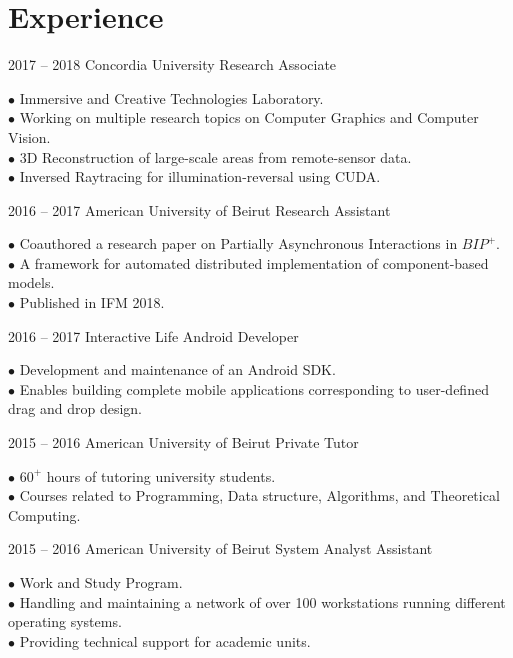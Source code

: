 \documentclass{tccv}
\begin{document}
\section{Experience}
\begin{eventlist}

\item{2017 -- 2018}
     {Concordia University}
     {Research Associate}

$\bullet$ Immersive and Creative Technologies Laboratory.\\
$\bullet$ Working on multiple research topics on Computer Graphics and Computer Vision.\\
$\bullet$ 3D Reconstruction of large-scale areas from remote-sensor data.\\
$\bullet$ Inversed Raytracing for illumination-reversal using CUDA.



\item{2016 -- 2017}
     {American University of Beirut}
     {Research Assistant}

$\bullet$ Coauthored a research paper on Partially Asynchronous Interactions in $BIP^+$.\\
$\bullet$ A framework for automated distributed implementation of component-based models. \\
    $\bullet$ Published in IFM 2018. 

\item{2016 -- 2017}
     {Interactive Life}
     {Android Developer}

$\bullet$ Development and maintenance of an Android SDK.\\
$\bullet$ Enables building complete mobile applications corresponding to user-defined drag and drop design.

\item{2015 -- 2016}
     {American University of Beirut}
     {Private Tutor}

$\bullet$ $60^+$ hours of tutoring university students.\\
$\bullet$ Courses related to Programming, Data structure, Algorithms, and Theoretical Computing.

\item{2015 -- 2016}
     {American University of Beirut}
     {System Analyst Assistant}

$\bullet$ Work and Study Program.\\
$\bullet$ Handling and maintaining a network of over 100 workstations running different operating systems. \\
$\bullet$ Providing technical support for academic units.


\end{eventlist}
\end{document}
